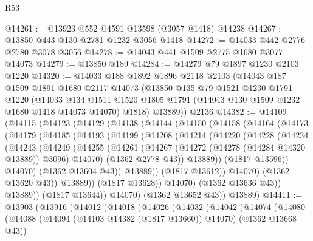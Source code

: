 \begin{lexlean}{R53}
\begin{coremodule}
@14261 := @13923 @552 @4591 @13598 (@3057 @1418) @14238
@14267 := @13850 @443 @130 @2781 @1232 @3056 @1418
@14272 := @14033 @442 @2776 @2780 @3078 @3056
@14278 := @14043 @441 @1509 @2775 @1680 @3077 @14073
@14279 := @13850 @189
@14284 := @14279 @79 @1897 @1230 @2103 @1220
@14320 := @14033
    @188
    @1892
    @1896
    @2118
    @2103
    (@14043
      @187
      @1509
      @1891
      @1680
      @2117
      @14073
      (@13850
        @135
        @79
        @1521
        @1230
        @1791
        @1220
        (@14033
          @134
          @1511
          @1520
          @1805
          @1791
          (@14043 @130 @1509 @1232 @1680 @1418 @14073 @14070)
          @1818)
        @13889))
    @2136
@14382 := @14109
    (@14115
      (@14123
        (@14129
          (@14138
            (@14144
              (@14150
                (@14158
                  (@14164
                    (@14173
                      (@14179
                        (@14185
                          (@14193
                            (@14199
                              (@14208
                                (@14214
                                  (@14220
                                    (@14228
                                      (@14234
                                        (@14243
                                          (@14249
                                            (@14255
                                              (@14261
                                                (@14267
                                                  (@14272 (@14278 (@14284 @14320 @13889)) @3096)
                                                  @14070)
                                                (@1362 @2778 @43))
                                              @13889))
                                          (@1817 @13596))
                                        @14070)
                                      (@1362 @13604 @43))
                                    @13889))
                                (@1817 @13612))
                              @14070)
                            (@1362 @13620 @43))
                          @13889))
                      (@1817 @13628))
                    @14070)
                  (@1362 @13636 @43))
                @13889))
            (@1817 @13644))
          @14070)
        (@1362 @13652 @43))
      @13889)
@14411 := @13903
    (@13916
      (@14012
        (@14018
          (@14026
            (@14032
              (@14042
                (@14074
                  (@14080
                    (@14088 (@14094 (@14103 @14382 (@1817 @13660)) @14070) (@1362 @13668 @43))

\end{coremodule}
\end{lexlean}
